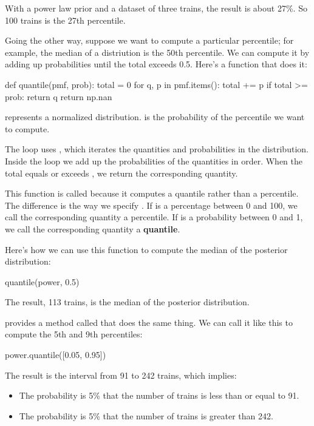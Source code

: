 \documentclass[12pt]{book}
\theoremstyle{exercise}
\begin{document}
With a power law prior and a dataset of three trains, the result is about 27\%.
So 100 trains is the 27th percentile.

Going the other way, suppose we want to compute a particular percentile; for example, the median of a distriution is the 50th percentile.
We can compute it by adding up probabilities until the total exceeds 0.5.
Here's a function that does it:

\begin{code}
def quantile(pmf, prob):
    total = 0
    for q, p in pmf.items():
        total += p
        if total >= prob:
            return q
    return np.nan
\end{code}

 represents a normalized distribution.
 is the probability of the percentile we want to compute.

The loop uses , which iterates the quantities and probabilities in the distribution.
Inside the loop we add up the probabilities of the quantities in order.
When the total equals or exceeds , we return the corresponding quantity.

This function is called  because it computes a quantile rather than a percentile.
The difference is the way we specify .
If  is a percentage between 0 and 100, we call the corresponding quantity a percentile.
If  is a probability between 0 and 1, we call the corresponding quantity a {\bf quantile}.

Here's how we can use this function to compute the median of the posterior distribution:

\begin{code}
quantile(power, 0.5)
\end{code}

The result, 113 trains, is the median of the posterior distribution.

 provides a method called  that does the same thing.
We can call it like this to compute the 5th and 9th percentiles:

\begin{code}
power.quantile([0.05, 0.95])
\end{code}

The result is the interval from 91 to 242 trains, which implies:

\begin{itemize}

\item The probability is 5\% that the number of trains is less than or equal to 91.

\item The probability is 5\% that the number of trains is greater than 242.

\end{itemize}
\end{document}
